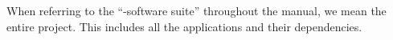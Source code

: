 

When referring to the ``\giraf-software suite'' throughout the manual, we mean the entire \giraf project. This includes all the applications and their dependencies. 



